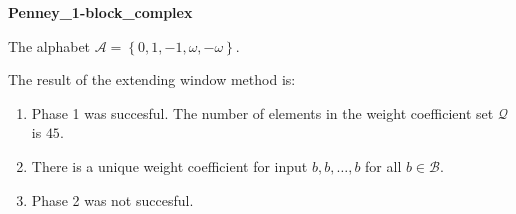 \begin{exmp}
\textbf{ Penney\_1-block\_complex }

\label{subsec:Penney1-blockcomplex}

The alphabet $\mathcal{A} =\left\{0, 1, -1, \omega, -\omega\right\}$.

The result of the extending window method is:
\begin{enumerate}
    \item Phase 1 was succesful.
The number of elements in the weight coefficient set $\mathcal{Q}$ is $45$.

    \item There is a unique weight coefficient for input $b,b,\dots,b$ for all $b\in\mathcal{B}$.

    \item Phase 2 was not succesful.

\end{enumerate}
\end{exmp}
